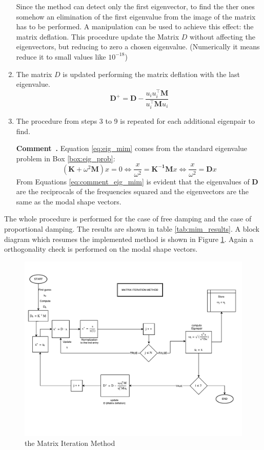 \documentclass[twosided,a4paper]{article}           %
\newcounter{comment}[section]
\newenvironment{comment}[1][]{\refstepcounter{comment}\par\medskip
	\noindent \textbf{Comment~\thecomment. #1} }{\par}
\newcounter{box}
\newcommand{\tr}{^{{\bm \top}}}
\begin{document}
\begin{enumerate}
	Since the method can detect only the first eigenvector, to find the ther ones somehow an elimination of the first eigenvalue from the image of the matrix has to be performed. A manipulation can be used to achieve this effect: the matrix deflation. This procedure update the Matrix $D$ without affecting the eigenvectors, but reducing to zero a chosen eigenvalue. (Numerically it means reduce it to small values like $10^{-18}$)
		\item The matrix $D$ is updated performing the matrix deflation with the last eigenvalue.
		\begin{equation}
			\bm{D^+} =\bm{ D} - \dfrac{u_i u_i\tr \bm{M}}{u_i\tr \bm{M} u_i}
		\end{equation}
	\item The procedure from steps 3 to 9 is repeated for each additional eigenpair to find.
		
 \begin{comment}
 \label{com:eig_mim}
 	Equation \eqref{eq:eig_mim} comes from the standard eigenvalue problem in Box \ref{box:eig_prob}:
 	\begin{equation}
 	\label{eq:comment_eig_mim}
 	\left ( \bm{K}+\omega^2\bm{M}\right )x = 0 \Leftrightarrow \dfrac{x}{\omega^2} = \bm{K^{-1}}\bm{M}x \Leftrightarrow \dfrac{x}{\omega^2} = \bm{D}x
 	\end{equation}
 	From Equations \eqref{eq:comment_eig_mim} is evident that the eigenvalues of $\bm{D}$ are the reciprocals of the frequencies squared and the eigenvectors are the same as the modal shape vectors.
 \end{comment}
	\end{enumerate}
The whole procedure is performed for the case of free damping and the case of proportional damping. The results are shown in table \ref{tab:mim_results}.
	A block diagram which resumes the implemented method is shown in Figure \ref{fig:mim}. Again a orthogonality check is performed on the modal shape vectors.
	
	
	
	\begin{figure}[H]
		\centering
		\includegraphics[width=\linewidth]{img/mim}
		\caption{the Matrix Iteration Method}
		\label{fig:mim}
	\end{figure}
	
\end{document}
